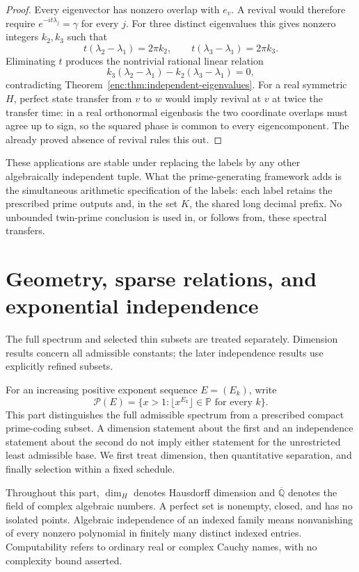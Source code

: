 \documentclass[11pt,a4paper]{article}
\theoremstyle{definition}
\theoremstyle{remark}
\numberwithin{equation}{section}
\begin{document}
\begin{proof}
Every eigenvector has nonzero overlap with $e_v$.  A revival would
therefore require $e^{-it\lambda_j}=\gamma$ for every $j$.  For three
distinct eigenvalues this gives nonzero integers $k_2,k_3$ such that
\[
 t(\lambda_2-\lambda_1)=2\pi k_2,
 \qquad t(\lambda_3-\lambda_1)=2\pi k_3.
\]
Eliminating $t$ produces the nontrivial rational linear relation
\[
 k_3(\lambda_2-\lambda_1)-k_2(\lambda_3-\lambda_1)=0,
\]
contradicting Theorem~\ref{enc:thm:independent-eigenvalues}.
For a real symmetric $H$, perfect state transfer from $v$ to $w$
would imply revival at $v$ at twice the transfer time: in a real
orthonormal eigenbasis the two coordinate overlaps must agree up to
sign, so the squared phase is common to every eigencomponent.
The already proved absence of revival rules this out.
\end{proof}

These applications are stable under replacing the labels by any other
algebraically independent tuple.  What the prime-generating framework
adds is the simultaneous arithmetic specification of the labels:
each label retains the prescribed prime outputs and, in the set $K$,
the shared long decimal prefix.  No unbounded twin-prime conclusion is
used in, or follows from, these spectral transfers.


\clearpage
\part{Geometry, sparse relations, and exponential independence}\label{part:geometry}
The full spectrum and selected thin subsets are treated separately. Dimension results concern all admissible constants; the later independence results use explicitly refined subsets.

For an increasing positive exponent sequence $E=(E_k)$, write
\[
 \mathcal P(E)=\{x>1:\lfloor x^{E_k}\rfloor\in\mathbb P
                         \text{ for every }k\}.
\]
This part distinguishes the full admissible spectrum from a prescribed
compact prime-coding subset. A dimension statement about the first and
an independence statement about the second do not imply either statement
for the unrestricted least admissible base. We first treat dimension,
then quantitative separation, and finally selection within a fixed schedule.

Throughout this part, $\dim_H$ denotes Hausdorff dimension and
$\overline{\mathbb Q}$ denotes the field of complex algebraic numbers.
A perfect set is nonempty, closed, and has no isolated points.
Algebraic independence of an indexed family means nonvanishing of every
nonzero polynomial in finitely many distinct indexed entries.
Computability refers to ordinary real or complex Cauchy names, with no
complexity bound asserted.
\end{document}
